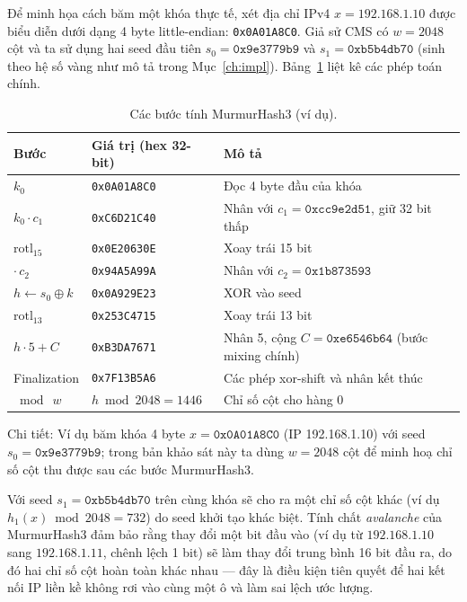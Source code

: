 Để minh họa cách băm một khóa thực tế, xét địa chỉ IPv4 $x = 192.168.1.10$ được biểu diễn dưới dạng 4 byte little-endian: \texttt{0x0A01A8C0}. Giả sử CMS có $w = 2048$ cột và ta sử dụng hai seed đầu tiên $s_0 = \texttt{0x9e3779b9}$ và $s_1 = \texttt{0xb5b4db70}$ (sinh theo hệ số vàng như mô tả trong Mục~\ref{ch:impl}). Bảng~\ref{tab:murmur-trace} liệt kê các phép toán chính.

\begin{table}[H]
  \centering
  \caption{Các bước tính MurmurHash3 (ví dụ).}
  \label{tab:murmur-trace}
  \small
  \begin{tabularx}{\linewidth}{@{}l l X@{}}
    \toprule
    \textbf{Bước} & \textbf{Giá trị (hex 32-bit)} & \textbf{Mô tả} \\
    \midrule
    $k_0$                & \texttt{0x0A01A8C0}      & Đọc 4 byte đầu của khóa \\
    $k_0 \cdot c_1$      & \texttt{0xC6D21C40}      & Nhân với $c_1 = \texttt{0xcc9e2d51}$, giữ 32 bit thấp \\
    $\text{rotl}_{15}$   & \texttt{0x0E20630E}      & Xoay trái 15 bit \\
    $\cdot\, c_2$        & \texttt{0x94A5A99A}      & Nhân với $c_2 = \texttt{0x1b873593}$ \\
    $h \gets s_0 \oplus k$ & \texttt{0x0A929E23}    & XOR vào seed \\
    $\text{rotl}_{13}$   & \texttt{0x253C4715}      & Xoay trái 13 bit \\
    $h \cdot 5 + C$      & \texttt{0xB3DA7671}      & Nhân 5, cộng $C = \texttt{0xe6546b64}$ (bước mixing chính) \\
    Finalization         & \texttt{0x7F13B5A6}      & Các phép xor-shift và nhân kết thúc \\
    $\bmod\ w$           & $h \bmod 2048 = 1446$    & Chỉ số cột cho hàng 0 \\
    \bottomrule
  \end{tabularx}
\end{table}

\noindent Chi tiết: Ví dụ băm khóa 4 byte $x = \texttt{0x0A01A8C0}$ (IP 192.168.1.10) với seed $s_0 = \texttt{0x9e3779b9}$; trong bản khảo sát này ta dùng $w = 2048$ cột để minh hoạ chỉ số cột thu được sau các bước MurmurHash3.

Với seed $s_1 = \texttt{0xb5b4db70}$ trên cùng khóa sẽ cho ra một chỉ số cột khác (ví dụ $h_1(x) \bmod 2048 = 732$) do seed khởi tạo khác biệt. Tính chất \textit{avalanche} của MurmurHash3 đảm bảo rằng thay đổi một bit đầu vào (ví dụ từ $192.168.1.10$ sang $192.168.1.11$, chênh lệch 1 bit) sẽ làm thay đổi trung bình 16 bit đầu ra, do đó hai chỉ số cột hoàn toàn khác nhau --- đây là điều kiện tiên quyết để hai kết nối IP liền kề không rơi vào cùng một ô và làm sai lệch ước lượng.

